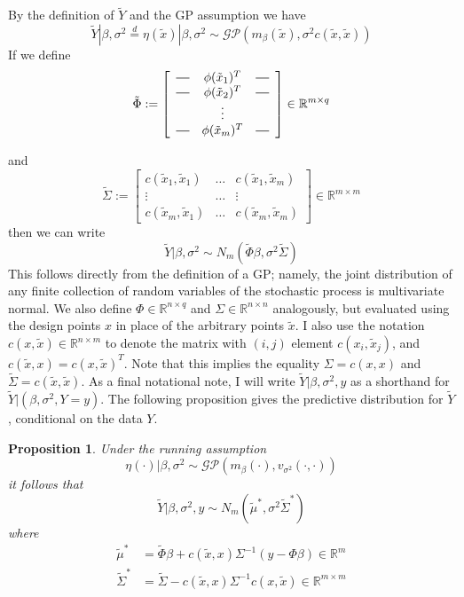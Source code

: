 \documentclass[12pt]{article}
\newcommand{\R}{\mathcal{R}}
\def\R{\mathbb{R}}
\newcommand*{\horzbar}{\rule[.5ex]{2.5ex}{0.5pt}} %
\newtheorem{prop}{Proposition}
\begin{document}
By the definition of $\tilde{Y}$ and the GP assumption we have 
\[\tilde{Y}|\beta, \sigma^2 \overset{d}{=} \eta(\tilde{x})|\beta, \sigma^2 \sim \mathcal{GP}(m_\beta (\tilde{x}), \sigma^2 c(\tilde{x}, \tilde{x}))\]
If we define 
\[
\tilde{\Phi} := 
\left[
  \begin{array}{ccc}
    \horzbar & \phi(\tilde{x}_1)^T & \horzbar \\
    \horzbar & \phi(\tilde{x}_2)^T & \horzbar \\
             & \vdots    &          \\
    \horzbar & \phi(\tilde{x}_m)^T & \horzbar
  \end{array}
\right] \in \R^{m \times q}
\]

and 
\[\tilde{\Sigma} := \begin{bmatrix} c(\tilde{x}_1, \tilde{x}_1) & \hdots & c(\tilde{x}_1, \tilde{x}_m) \\
                                         \vdots & \hdots & \vdots \\
                                          c(\tilde{x}_m, \tilde{x}_1) & \hdots & c(\tilde{x}_m, \tilde{x}_m) 
                                          \end{bmatrix} \in \R^{m \times m}\]
then we can write
\[\tilde{Y}|\beta, \sigma^2 \sim N_m \left(\tilde{\Phi} \beta, \sigma^2 \tilde{\Sigma} \right)\]
This follows directly from the definition of a GP; namely, the joint distribution of any finite collection of random variables of the stochastic process is multivariate normal. 
We also define $\Phi \in \R^{n \times q}$ and $\Sigma \in \R^{n \times n}$ analogously, but evaluated using the design points $x$ in place of the arbitrary points $\tilde{x}$. 
I also use the notation $c(x, \tilde{x}) \in \R^{n \times m}$ to denote the matrix with $(i, j)$ element $c(x_i, \tilde{x}_j)$, and $c(\tilde{x}, x) = c(x, \tilde{x})^T$. Note that this implies
the equality $\Sigma = c(x, x)$ and $\tilde{\Sigma} = c(\tilde{x}, \tilde{x})$. As a final notational note, I will write $\tilde{Y}|\beta, \sigma^2, y$ as a shorthand for 
$\tilde{Y}|(\beta, \sigma^2, Y = y)$. 
The following proposition
gives the predictive distribution for $\tilde{Y}$, conditional on the data $Y$. 
\begin{prop}
Under the running assumption 
\[\eta(\cdot)|\beta, \sigma^2 \sim \mathcal{GP}(m_\beta (\cdot), v_{\sigma^2}(\cdot, \cdot)) \]
it follows that 
\[\tilde{Y}|\beta, \sigma^2, y \sim N_m \left(\tilde{\mu}^*, \sigma^2 \tilde{\Sigma}^* \right)\] 
where 
\begin{align*}
\tilde{\mu}^* &= \tilde{\Phi}\beta + c(\tilde{x}, x)\Sigma^{-1}(y - \Phi \beta) \in \R^m \\ 
\tilde{\Sigma}^* &= \tilde{\Sigma} - c(\tilde{x}, x) \Sigma^{-1} c(x, \tilde{x}) \in \R^{m \times m}
\end{align*}
\end{prop}
\end{document}
